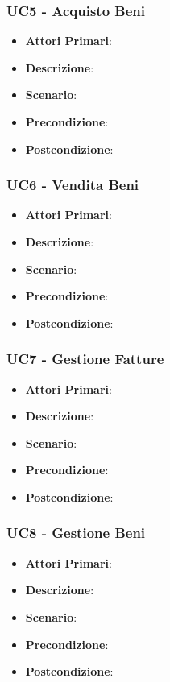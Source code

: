 \subsubsection{UC5 - Acquisto Beni}
\begin{itemize}
	\item \textbf{Attori Primari}:
	\item \textbf{Descrizione}:
	\item \textbf{Scenario}:
	\item \textbf{Precondizione}:
	\item \textbf{Postcondizione}:
\end{itemize}
\subsubsection{UC6 - Vendita Beni}
\begin{itemize}
	\item \textbf{Attori Primari}:
	\item \textbf{Descrizione}:
	\item \textbf{Scenario}:
	\item \textbf{Precondizione}:
	\item \textbf{Postcondizione}:
\end{itemize}
\subsubsection{UC7 - Gestione Fatture}
\begin{itemize}
	\item \textbf{Attori Primari}:
	\item \textbf{Descrizione}:
	\item \textbf{Scenario}:
	\item \textbf{Precondizione}:
	\item \textbf{Postcondizione}:
\end{itemize}
\subsubsection{UC8 - Gestione Beni}
\begin{itemize}
	\item \textbf{Attori Primari}:
	\item \textbf{Descrizione}:
	\item \textbf{Scenario}:
	\item \textbf{Precondizione}:
	\item \textbf{Postcondizione}:
\end{itemize}
